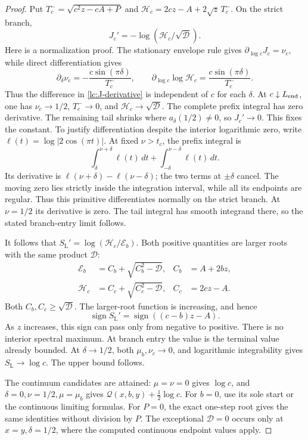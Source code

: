 \begin{proof}
Put \(T_c^-=\sqrt{c^2z-cA+P}\) and
\(\mathcal H_c=2cz-A+2\sqrt z\,T_c^-\). On the strict branch,
\begin{equation}\label{lc:J-derivative}
                  J_c'=-\log(\mathcal H_c/\sqrt{\mathcal D}).
\end{equation}
Here is a normalization proof. The stationary envelope rule gives
\(\partial_{\log c}J_c=\nu_c\), while direct differentiation gives
\[
 \partial_\delta\nu_c=-\frac{c\sin(\pi\delta)}{T_c^-},\qquad
 \partial_{\log c}\log\mathcal H_c=
                         \frac{c\sin(\pi\delta)}{T_c^-}.
\]
Thus the difference in \eqref{lc:J-derivative} is independent of
\(c\) for each \(\delta\). At \(c\downarrow L_{\rm end}\), one has
\(\nu_c\to1/2\), \(T_c^-\to0\), and \(\mathcal H_c\to\sqrt{\mathcal D}\).
The complete prefix integral has zero derivative. The remaining
tail shrinks where \(a_\delta(1/2)\ne0\), so \(J_c'\to0\).
This fixes the constant. To justify differentiation despite the
interior logarithmic zero, write \(\ell(t)=\log|2\cos(\pi t)|\).
At fixed \(\nu>t_c\), the prefix integral is
\[
 \int_\delta^{\nu+\delta}\ell(t)\,dt+
 \int_{-\delta}^{\nu-\delta}\ell(t)\,dt.
\]
Its derivative is
\(\ell(\nu+\delta)-\ell(\nu-\delta)\); the two terms at
\(\pm\delta\) cancel. The moving zero lies strictly inside the
integration interval, while all its endpoints are regular.
Thus this primitive differentiates normally on the strict branch.
At \(\nu=1/2\) its derivative is zero. The tail integral has
smooth integrand there, so the stated branch-entry limit follows.

It follows that \(S_{\mathrm L}'=\log(\mathcal H_c/\mathcal E_b)\).
Both positive quantities are larger roots with the same product
\(\mathcal D\):
\[
\begin{aligned}
 \mathcal E_b&=C_b+\sqrt{C_b^2-\mathcal D},&C_b&=A+2bz,\\
 \mathcal H_c&=C_c+\sqrt{C_c^2-\mathcal D},&C_c&=2cz-A.
\end{aligned}
\]
Both \(C_b,C_c\ge\sqrt{\mathcal D}\). The larger-root function is
increasing, and hence
\[
             \operatorname{sign}S_{\mathrm L}'
                      =\operatorname{sign}((c-b)z-A).
\]
As \(z\) increases, this sign can pass only from negative to positive.
There is no interior spectral maximum. At branch entry the value
is the terminal value already bounded. At \(\delta\to1/2\), both
\(\mu_b,\nu_c\to0\), and logarithmic integrability gives
\(S_{\mathrm L}\to\log c\). The upper bound follows.

The continuum candidates are attained: \(\mu=\nu=0\) gives \(\log c\),
and \(\delta=0,\nu=1/2,\mu=\mu_b\) gives
\(\mathcal Q(x,b,y)+\frac12\log c\).
For \(b=0\), use its sole start or the continuous limiting formulas.
For \(P=0\), the exact one-step root gives the same identities
without division by \(P\). The exceptional \(\mathcal D=0\) occurs
only at \(x=y,\delta=1/2\), where the computed continuous endpoint
values apply.
\end{proof}

